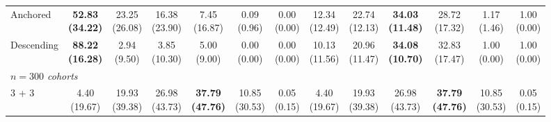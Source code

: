 {\begin{tabular}{l|cccccc|cccccc}
Anchored & \bfseries \makecell{52.83 \\ (34.22)} & \makecell{23.25 \\ (26.08)} & {\cellcolor[HTML]{C8E6C9}} \makecell{16.38 \\ (23.90)} & \makecell{7.45 \\ (16.87)} & \makecell{0.09 \\ (0.96)} & \makecell{0.00 \\ (0.00)} & \makecell{12.34 \\ (12.49)} & \makecell{22.74 \\ (12.13)} & {\cellcolor[HTML]{C8E6C9}} \bfseries \makecell{34.03 \\ (11.48)} & \makecell{28.72 \\ (17.32)} & \makecell{1.17 \\ (1.46)} & \makecell{1.00 \\ (0.00)} \\
Descending & \bfseries \makecell{88.22 \\ (16.28)} & \makecell{2.94 \\ (9.50)} & {\cellcolor[HTML]{C8E6C9}} \makecell{3.85 \\ (10.30)} & \makecell{5.00 \\ (9.00)} & \makecell{0.00 \\ (0.00)} & \makecell{0.00 \\ (0.00)} & \makecell{10.13 \\ (11.56)} & \makecell{20.96 \\ (11.47)} & {\cellcolor[HTML]{C8E6C9}} \bfseries \makecell{34.08 \\ (10.70)} & \makecell{32.83 \\ (17.47)} & \makecell{1.00 \\ (0.00)} & \makecell{1.00 \\ (0.00)} \\
\midrule
\multicolumn{13}{l}{\emph{$n = 300$ cohorts}} \\
3 + 3 & \makecell{4.40 \\ (19.67)} & \makecell{19.93 \\ (39.38)} & {\cellcolor[HTML]{C8E6C9}} \makecell{26.98 \\ (43.73)} & \bfseries \makecell{37.79 \\ (47.76)} & \makecell{10.85 \\ (30.53)} & \makecell{0.05 \\ (0.15)} & \makecell{4.40 \\ (19.67)} & \makecell{19.93 \\ (39.38)} & {\cellcolor[HTML]{C8E6C9}} \makecell{26.98 \\ (43.73)} & \bfseries \makecell{37.79 \\ (47.76)} & \makecell{10.85 \\ (30.53)} & \makecell{0.05 \\ (0.15)} \\

\end{tabular}}

